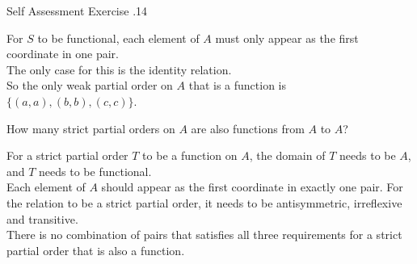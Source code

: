 \documentclass[\main/notes.tex]{subfiles}
\begin{document}
\begin{exercise}{Self Assessment Exercise \thechapter.14}
\begin{questions}
\begin{questions}
\begin{answer}
										For $S$ to be functional, each element of $A$ must only appear as the first coordinate in one pair.\\
										The only case for this is the identity relation.\\
										So the only weak partial order on $A$ that is a function is $\bigl\{(a, a), (b, b), (c, c)\bigr\}$.
									\end{answer}
								\item How many strict partial orders on $A$ are also functions from $A$ to $A$?\\
									\begin{answer}
										For a strict partial order $T$ to be a function on $A$, the domain of $T$ needs to be $A$, and $T$ needs to be functional.\\
										Each element of $A$ should appear as the first coordinate in exactly one pair. For the relation to be a strict partial order, it needs to be antisymmetric, irreflexive and transitive.\\
										There is no combination of pairs that satisfies all three requirements for a strict partial order that is also a function.
									\end{answer}
							\end{questions}
					\end{questions}
				\end{exercise}
\end{document}

